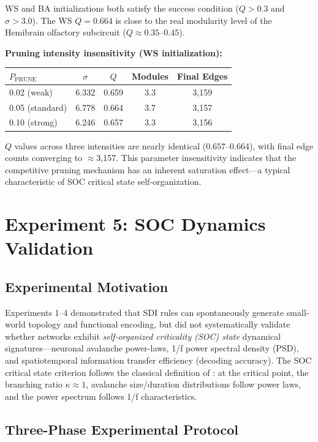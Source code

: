 \documentclass[12pt,a4paper]{article}
\begin{document}
WS and BA initializations both satisfy the success condition ($Q > 0.3$ and $\sigma > 3.0$). The WS $Q=0.664$ is close to the real modularity level of the Hemibrain olfactory subcircuit ($Q \approx 0.35$--$0.45$).

\textbf{Pruning intensity insensitivity (WS initialization):}
\begin{center}
\begin{tabular}{lcccc}
\toprule
$P_{\text{PRUNE}}$ & $\sigma$ & $Q$ & Modules & Final Edges \\
\midrule
0.02 (weak) & 6.332 & 0.659 & 3.3 & 3,159 \\
0.05 (standard) & 6.778 & 0.664 & 3.7 & 3,157 \\
0.10 (strong) & 6.246 & 0.657 & 3.3 & 3,156 \\
\bottomrule
\end{tabular}
\end{center}

$Q$ values across three intensities are nearly identical ($0.657$--$0.664$), with final edge counts converging to $\approx$3,157. This parameter insensitivity indicates that the competitive pruning mechanism has an inherent saturation effect---a typical characteristic of SOC critical state self-organization.

\section{Experiment 5: SOC Dynamics Validation}
\label{sec:exp5}

\subsection{Experimental Motivation}

Experiments 1--4 demonstrated that SDI rules can spontaneously generate small-world topology and functional encoding, but did not systematically validate whether networks exhibit \emph{self-organized criticality (SOC) state} dynamical signatures---neuronal avalanche power-laws, 1/f power spectral density (PSD), and spatiotemporal information transfer efficiency (decoding accuracy). The SOC critical state criterion follows the classical definition of \citet{beggs2003}: at the critical point, the branching ratio $\kappa \approx 1$, avalanche size/duration distributions follow power laws, and the power spectrum follows 1/f characteristics.

\subsection{Three-Phase Experimental Protocol}
\end{document}

